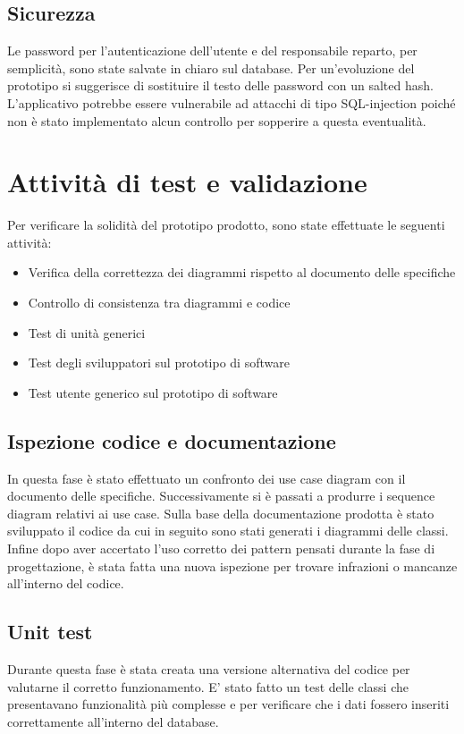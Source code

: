 \documentclass{article}
\begin{document}
\subsection{Sicurezza}
Le password per l'autenticazione dell'utente e del responsabile reparto, per semplicità, sono state salvate in chiaro sul database.
Per un'evoluzione del prototipo si suggerisce di sostituire il testo delle password con un salted hash.
L'applicativo potrebbe essere vulnerabile ad attacchi di tipo SQL-injection poiché non è stato implementato alcun controllo per sopperire a questa eventualità.

\section{Attività di test e validazione}
Per verificare la solidità del prototipo prodotto, sono state effettuate le seguenti attività:
\begin{itemize}
    \item{Verifica della correttezza dei diagrammi rispetto al documento delle specifiche}
    \item{Controllo di consistenza tra diagrammi e codice}
    \item{Test di unità generici }
    \item{Test degli sviluppatori sul prototipo di software }
    \item{Test utente generico sul prototipo di software}
\end{itemize}
\subsection{Ispezione codice e documentazione}
\noindent
In questa fase è stato effettuato un confronto dei use case diagram con  il documento delle specifiche. Successivamente si è passati a produrre i sequence diagram relativi ai use case.
Sulla base della documentazione prodotta è stato sviluppato il codice da cui in seguito sono stati generati i diagrammi delle classi. Infine dopo aver accertato l'uso corretto dei pattern pensati durante la fase di progettazione, è stata fatta una nuova ispezione per trovare infrazioni o mancanze all'interno del codice.
\subsection{Unit test}
Durante questa fase è stata creata una versione alternativa del codice per valutarne il corretto funzionamento. E' stato fatto un test delle classi che presentavano funzionalità più complesse  e per verificare che i dati fossero inseriti correttamente all'interno del database.
\end{document}
